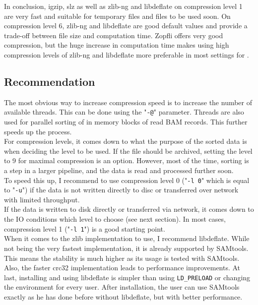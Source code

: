 In conclusion, igzip, slz as well as zlib-ng and libdeflate on compression level 1 are very fast and suitable for temporary files and files to be used soon. On compression level 6, zlib-ng and libdeflate are good default values and provide a trade-off between file size and computation time. Zopfli offers very good compression, but the huge increase in computation time makes using high compression levels of zlib-ng and libdeflate more preferable in most settings for \sort.

\subsection{Recommendation}
The most obvious way to increase compression speed is to increase the number of available threads. This can be done using the "\texttt{-@}" parameter. Threads are also used for parallel sorting of in memory blocks of read BAM records. This further speeds up the process. \\
For compression levels, it comes down to what the purpose of the sorted data is when deciding the level to be used. 
If the file should be archived, setting the level to 9 for maximal compression is an option. However, most of the time, sorting is a step in a larger pipeline, and the data is read and processed further soon. \\
To speed this up, I recommend to use compression level 0 ("\texttt{-l 0}" which is equal to "\texttt{-u}") if the data is not written directly to  disc or transferred over network with limited throughput. \\
If the data is written to disk directly or transferred via network, it comes down to the IO conditions which level to choose (see next section). In most cases, compression level 1 ("\texttt{-l 1}") is a good starting point.\\
When it comes to the zlib implementation to use, I recommend libdeflate. While not being the very fastest implementation, it is already supported by SAMtools. This means the stability is much higher as its usage is tested with SAMtools. Also, the faster crc32 implementation leads to performance improvements. At last, installing and using libdeflate is simpler than using \texttt{LD\_PRELOAD} or changing the environment for every user. After installation, the user can use SAMtools exactly as he has done before without libdeflate, but with better performance.

